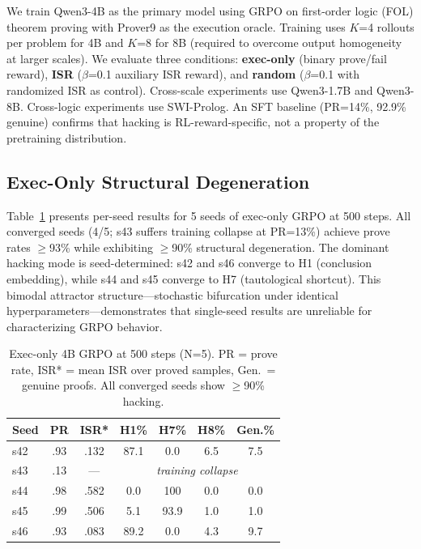 \documentclass[11pt]{article}
\begin{document}
We train Qwen3-4B \cite{qwen3} as the primary model using GRPO on first-order logic (FOL) theorem proving with Prover9 as the execution oracle. Training uses $K$=4 rollouts per problem for 4B and $K$=8 for 8B (required to overcome output homogeneity at larger scales). We evaluate three conditions: \textbf{exec-only} (binary prove/fail reward), \textbf{ISR} ($\beta$=0.1 auxiliary ISR reward), and \textbf{random} ($\beta$=0.1 with randomized ISR as control). Cross-scale experiments use Qwen3-1.7B and Qwen3-8B. Cross-logic experiments use SWI-Prolog. An SFT baseline (PR=14\%, 92.9\% genuine) confirms that hacking is RL-reward-specific, not a property of the pretraining distribution.

\subsection{Exec-Only Structural Degeneration}

Table~\ref{tab:exec-only-5seed} presents per-seed results for 5 seeds of exec-only GRPO at 500 steps. All converged seeds (4/5; s43 suffers training collapse at PR=13\%) achieve prove rates $\geq$93\% while exhibiting $\geq$90\% structural degeneration. The dominant hacking mode is seed-determined: s42 and s46 converge to H1 (conclusion embedding), while s44 and s45 converge to H7 (tautological shortcut). This bimodal attractor structure---stochastic bifurcation under identical hyperparameters---demonstrates that single-seed results are unreliable for characterizing GRPO behavior.

\begin{table}[t]
\centering
\small
\begin{tabular}{lcccccc}
\toprule
Seed & PR & ISR* & H1\% & H7\% & H8\% & Gen.\% \\
\midrule
s42 & .93 & .132 & 87.1 & 0.0 & 6.5 & 7.5 \\
s43 & .13 & --- & \multicolumn{4}{c}{\emph{training collapse}} \\
s44 & .98 & .582 & 0.0 & 100 & 0.0 & 0.0 \\
s45 & .99 & .506 & 5.1 & 93.9 & 1.0 & 1.0 \\
s46 & .93 & .083 & 89.2 & 0.0 & 4.3 & 9.7 \\
\bottomrule
\end{tabular}
\caption{Exec-only 4B GRPO at 500 steps (N=5). PR = prove rate, ISR* = mean ISR over proved samples, Gen.\ = genuine proofs. All converged seeds show $\geq$90\% hacking.}
\label{tab:exec-only-5seed}
\end{table}
\end{document}
